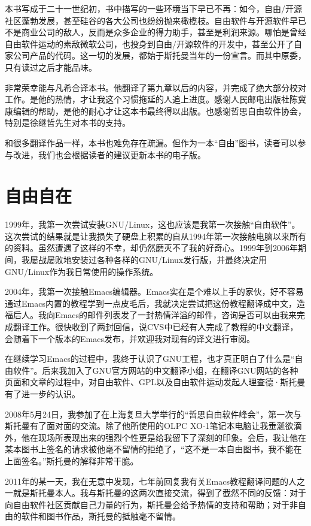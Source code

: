 本书写成于二十一世纪初，书中描写的一些环境当下早已不再：如今，自由/开源社区蓬勃发展，甚至硅谷的各大公司也纷纷抛来橄榄枝。自由软件与开源软件早已不是商业公司的敌人，反而是众多企业的得力助手，甚至是利润来源。哪怕是曾经自由软件运动的素敌微软公司，也投身到自由/开源软件的开发中，甚至公开了自家公司产品的代码。这一切的发展，都始于斯托曼当年的一份宣言。而其中原委，只有读过之后才能品味。

非常荣幸能与凡希合译本书。他翻译了第九章以后的内容，并完成了绝大部分校对工作。是他的热情，才让我这个习惯拖延的人追上进度。感谢人民邮电出版社陈冀康编辑的帮助，是他的耐心才让这本书最终得以出版。也感谢哲思自由软件协会，特别是徐继哲先生对本书的支持。

和很多翻译作品一样，本书也难免存在疏漏。但作为一本``自由''图书，读者可以参与改进，我们也会根据读者的建议更新本书的电子版。



\chapter{自由自在}

1999年，我第一次尝试安装GNU/Linux，这也应该是我第一次接触``自由软件''。这次尝试的结果就是让我损失了硬盘上积累的自从1994年第一次接触电脑以来所有的资料。虽然遭遇了这样的不幸，却仍然磨灭不了我的好奇心。1999年到2006年期间，我屡战屡败地安装过各种各样的GNU/Linux发行版，并最终决定用GNU/Linux作为我日常使用的操作系统。

2004年，我第一次接触Emacs编辑器。Emacs实在是个难以上手的家伙，好不容易通过Emacs内置的教程学到一点皮毛后，我就决定尝试把这份教程翻译成中文，造福后人。我向Emacs的邮件列表发了一封热情洋溢的邮件，咨询是否可以由我来完成翻译工作。很快收到了两封回信，说CVS中已经有人完成了教程的中文翻译，会随着下一个版本的Emacs发布，并欢迎我对现有的译文进行审阅。

在继续学习Emacs的过程中，我终于认识了GNU工程，也才真正明白了什么是``自由软件''。后来我加入了GNU官方网站的中文翻译小组，在翻译GNU网站的各种页面和文章的过程中，对自由软件、GPL以及自由软件运动发起人理查德·斯托曼有了进一步的认识。

2008年5月24日，我参加了在上海复旦大学举行的``哲思自由软件峰会''，第一次与斯托曼有了面对面的交流。除了他所使用的OLPC XO-1笔记本电脑让我垂涎欲滴外，他在现场所表现出来的强烈个性更是给我留下了深刻的印象。会后，我让他在某本图书上签名的请求被他毫不留情的拒绝了，``这不是一本自由图书，我不能在上面签名。''斯托曼的解释非常干脆。

2011年的某一天，我在无意中发现，七年前回复我有关Emacs教程翻译问题的人之一就是斯托曼本人。我与斯托曼的这两次直接交流，得到了截然不同的反馈：对于向自由软件社区贡献自己力量的行为，斯托曼会给予热情的支持和帮助；对于非自由的软件和图书作品，斯托曼的抵触毫不留情。

